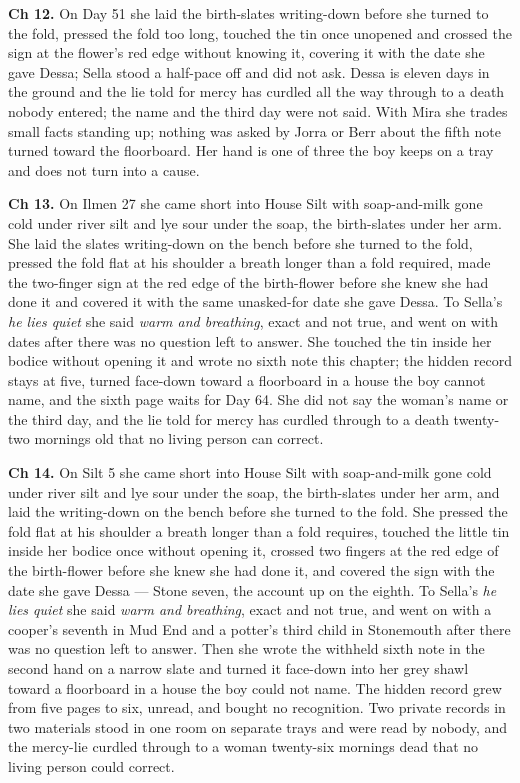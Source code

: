 \documentclass{design/chronicle}
\begin{document}
{\textbf{Ch 12.} On Day 51 she laid the birth-slates writing-down before she turned to the fold, pressed the fold too long, touched the tin once unopened and crossed the sign at the flower’s red edge without knowing it, covering it with the date she gave Dessa; Sella stood a half-pace off and did not ask. Dessa is eleven days in the ground and the lie told for mercy has curdled all the way through to a death nobody entered; the name and the third day were not said. With Mira she trades small facts standing up; nothing was asked by Jorra or Berr about the fifth note turned toward the floorboard. Her hand is one of three the boy keeps on a tray and does not turn into a cause.

\textbf{Ch 13.} On Ilmen 27 she came short into House Silt with soap-and-milk gone cold under river silt and lye sour under the soap, the birth-slates under her arm. She laid the slates writing-down on the bench before she turned to the fold, pressed the fold flat at his shoulder a breath longer than a fold required, made the two-finger sign at the red edge of the birth-flower before she knew she had done it and covered it with the same unasked-for date she gave Dessa. To Sella’s \emph{he lies quiet} she said \emph{warm and breathing}, exact and not true, and went on with dates after there was no question left to answer. She touched the tin inside her bodice without opening it and wrote no sixth note this chapter; the hidden record stays at five, turned face-down toward a floorboard in a house the boy cannot name, and the sixth page waits for Day 64. She did not say the woman’s name or the third day, and the lie told for mercy has curdled through to a death twenty-two mornings old that no living person can correct.

\textbf{Ch 14.} On Silt 5 she came short into House Silt with soap-and-milk gone cold under river silt and lye sour under the soap, the birth-slates under her arm, and laid the writing-down on the bench before she turned to the fold. She pressed the fold flat at his shoulder a breath longer than a fold requires, touched the little tin inside her bodice once without opening it, crossed two fingers at the red edge of the birth-flower before she knew she had done it, and covered the sign with the date she gave Dessa — Stone seven, the account up on the eighth. To Sella’s \emph{he lies quiet} she said \emph{warm and breathing}, exact and not true, and went on with a cooper’s seventh in Mud End and a potter’s third child in Stonemouth after there was no question left to answer. Then she wrote the withheld sixth note in the second hand on a narrow slate and turned it face-down into her grey shawl toward a floorboard in a house the boy could not name. The hidden record grew from five pages to six, unread, and bought no recognition. Two private records in two materials stood in one room on separate trays and were read by nobody, and the mercy-lie curdled through to a woman twenty-six mornings dead that no living person could correct.

}
\end{document}
